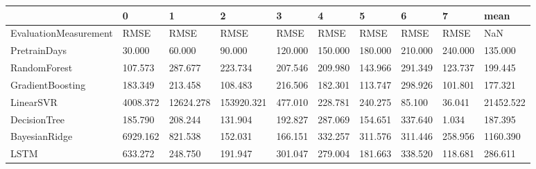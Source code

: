 \begin{tabular}{llllllllll}
\toprule
{} &        0 &         1 &          2 &       3 &       4 &       5 &       6 &       7 &      mean \\
\midrule
EvaluationMeasurement &     RMSE &      RMSE &       RMSE &    RMSE &    RMSE &    RMSE &    RMSE &    RMSE &       NaN \\
PretrainDays          &   30.000 &    60.000 &     90.000 & 120.000 & 150.000 & 180.000 & 210.000 & 240.000 &   135.000 \\
RandomForest          &  107.573 &   287.677 &    223.734 & 207.546 & 209.980 & 143.966 & 291.349 & 123.737 &   199.445 \\
GradientBoosting      &  183.349 &   213.458 &    108.483 & 216.506 & 182.301 & 113.747 & 298.926 & 101.801 &   177.321 \\
LinearSVR             & 4008.372 & 12624.278 & 153920.321 & 477.010 & 228.781 & 240.275 &  85.100 &  36.041 & 21452.522 \\
DecisionTree          &  185.790 &   208.244 &    131.904 & 192.827 & 287.069 & 154.651 & 337.640 &   1.034 &   187.395 \\
BayesianRidge         & 6929.162 &   821.538 &    152.031 & 166.151 & 332.257 & 311.576 & 311.446 & 258.956 &  1160.390 \\
LSTM                  &  633.272 &   248.750 &    191.947 & 301.047 & 279.004 & 181.663 & 338.520 & 118.681 &   286.611 \\
\bottomrule
\end{tabular}
